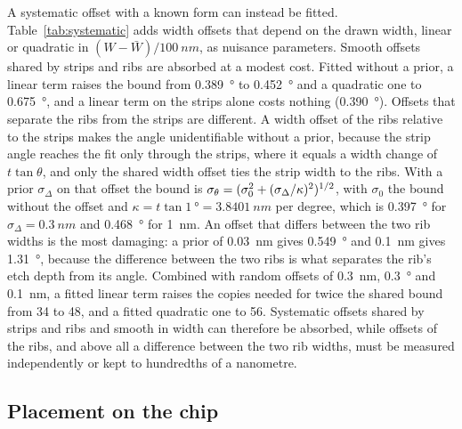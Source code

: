

A systematic offset with a known form can instead be fitted. Table~\ref{tab:systematic} adds width offsets that depend on the drawn width,
linear or quadratic in $(W-\bar W)/\qty{100}{nm}$, as nuisance parameters. Smooth offsets shared by strips and ribs are absorbed at a modest cost.
Fitted without a prior, a linear term raises the bound from \qty{0.389}{\degree} to \qty{0.452}{\degree} and a quadratic one to
\qty{0.675}{\degree}, and a linear term on the strips alone costs nothing (\qty{0.390}{\degree}). Offsets that separate the ribs from the strips are
different. A width offset of the ribs relative to the strips makes the angle unidentifiable without a prior, because the strip angle reaches the
fit only through the strips, where it equals a width change of $t\tan\theta$, and only the shared width offset ties the strip width to the ribs.
With a prior $\sigma_\Delta$ on that offset the bound is $\sigma_\theta=(\sigma_0^2+(\sigma_\Delta/\kappa)^2)^{1/2}$, with $\sigma_0$ the bound without
the offset and $\kappa=t\tan\qty{1}{\degree}=\qty{3.8401}{nm}$ per degree, which is
\qty{0.397}{\degree} for $\sigma_\Delta=\qty{0.3}{nm}$ and \qty{0.468}{\degree} for \qty{1}{nm}. An offset that differs between the two rib widths
is the most damaging: a prior of \qty{0.03}{nm} gives \qty{0.549}{\degree} and \qty{0.1}{nm} gives \qty{1.31}{\degree}, because the
difference between the two ribs is what separates the rib's etch depth from its angle. Combined with random offsets of \qty{0.3}{nm},
\qty{0.3}{\degree} and \qty{0.1}{nm}, a fitted linear term raises the copies needed for twice the shared bound from 34 to 48, and a
fitted quadratic one to 56. Systematic offsets shared by strips and ribs and smooth in width can therefore be absorbed, while offsets of the
ribs, and above all a difference between the two rib widths, must be measured independently or kept to hundredths of a nanometre.

\subsection{Placement on the chip}
\label{sec:layout}

